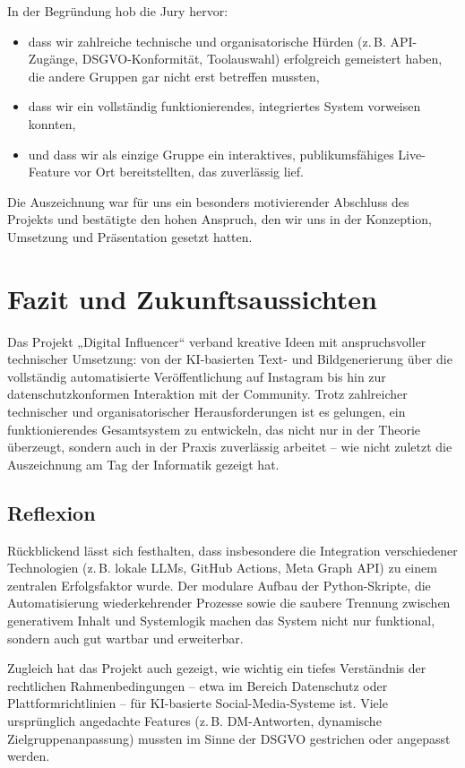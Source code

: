 \documentclass[a4paper,12pt]{article}
\begin{document}
In der Begründung hob die Jury hervor:

\begin{itemize}
    \item dass wir zahlreiche technische und organisatorische Hürden (z.\,B. API-Zugänge, DSGVO-Konformität, Toolauswahl) erfolgreich gemeistert haben, die andere Gruppen gar nicht erst betreffen mussten,
    \item dass wir ein vollständig funktionierendes, integriertes System vorweisen konnten,
    \item und dass wir als einzige Gruppe ein interaktives, publikumsfähiges Live-Feature vor Ort bereitstellten, das zuverlässig lief.
\end{itemize}

Die Auszeichnung war für uns ein besonders motivierender Abschluss des Projekts und bestätigte den hohen Anspruch, den wir uns in der Konzeption, Umsetzung und Präsentation gesetzt hatten.

\section{Fazit und Zukunftsaussichten}

Das Projekt „Digital Influencer“ verband kreative Ideen mit anspruchsvoller technischer Umsetzung: von der KI-basierten Text- und Bildgenerierung über die vollständig automatisierte Veröffentlichung auf Instagram bis hin zur datenschutzkonformen Interaktion mit der Community. Trotz zahlreicher technischer und organisatorischer Herausforderungen ist es gelungen, ein funktionierendes Gesamtsystem zu entwickeln, das nicht nur in der Theorie überzeugt, sondern auch in der Praxis zuverlässig arbeitet – wie nicht zuletzt die Auszeichnung am Tag der Informatik gezeigt hat.

\subsection{Reflexion}

Rückblickend lässt sich festhalten, dass insbesondere die Integration verschiedener Technologien (z.\,B. lokale LLMs, GitHub Actions, Meta Graph API) zu einem zentralen Erfolgsfaktor wurde. Der modulare Aufbau der Python-Skripte, die Automatisierung wiederkehrender Prozesse sowie die saubere Trennung zwischen generativem Inhalt und Systemlogik machen das System nicht nur funktional, sondern auch gut wartbar und erweiterbar.

Zugleich hat das Projekt auch gezeigt, wie wichtig ein tiefes Verständnis der rechtlichen Rahmenbedingungen – etwa im Bereich Datenschutz oder Plattformrichtlinien – für KI-basierte Social-Media-Systeme ist. Viele ursprünglich angedachte Features (z.\,B. DM-Antworten, dynamische Zielgruppenanpassung) mussten im Sinne der DSGVO gestrichen oder angepasst werden.
\end{document}
